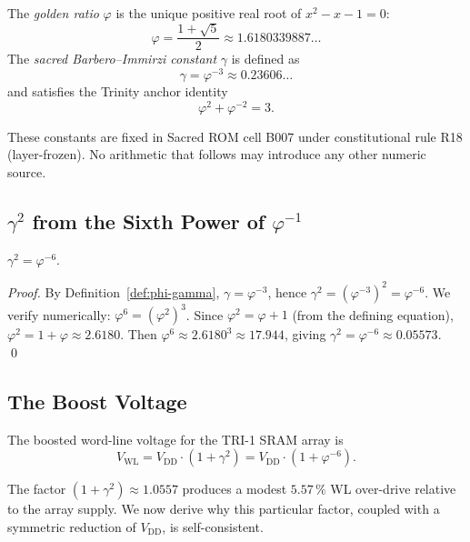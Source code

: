 \begin{definition}
\label{def:phi-gamma}
The \emph{golden ratio} $\varphi$ is the unique positive real root of
$x^{2} - x - 1 = 0$:
\[
  \varphi = \frac{1 + \sqrt{5}}{2} \approx 1.6180339887\ldots
\]
The \emph{sacred Barbero--Immirzi constant} $\gamma$ is defined as
\[
  \gamma = \varphi^{-3} \approx 0.23606\ldots
\]
and satisfies the Trinity anchor identity
\[
  \varphi^{2} + \varphi^{-2} = 3.
\]
\end{definition}

These constants are fixed in Sacred ROM cell B007 under constitutional
rule R18 (layer-frozen).  No arithmetic that follows may introduce any
other numeric source.

\subsection{\texorpdfstring{$\gamma^{2}$}{gamma squared} from the Sixth Power of \texorpdfstring{$\varphi^{-1}$}{phi inverse}}

\begin{lemma}
\label{lem:gamma-sq}
$\gamma^{2} = \varphi^{-6}$.
\end{lemma}

\begin{proof}
By Definition~\ref{def:phi-gamma}, $\gamma = \varphi^{-3}$, hence
$\gamma^{2} = (\varphi^{-3})^{2} = \varphi^{-6}$.
We verify numerically: $\varphi^{6} = (\varphi^{2})^{3}$.
Since $\varphi^{2} = \varphi + 1$ (from the defining equation),
$\varphi^{2} = 1 + \varphi \approx 2.6180$.
Then $\varphi^{6} \approx 2.6180^{3} \approx 17.944$, giving
$\gamma^{2} = \varphi^{-6} \approx 0.05573$.  \qed
\end{proof}

\subsection{The Boost Voltage}

\begin{definition}
\label{def:vwl}
The boosted word-line voltage for the TRI-1 SRAM array is
\[
  V_{\mathrm{WL}} = V_{\mathrm{DD}} \cdot (1 + \gamma^{2})
               = V_{\mathrm{DD}} \cdot (1 + \varphi^{-6}).
\]
\end{definition}

The factor $(1 + \gamma^{2}) \approx 1.0557$ produces a modest
$5.57\,\%$ WL over-drive relative to the array supply.  We now derive
why this particular factor, coupled with a symmetric reduction of
$V_{\mathrm{DD}}$, is self-consistent.

